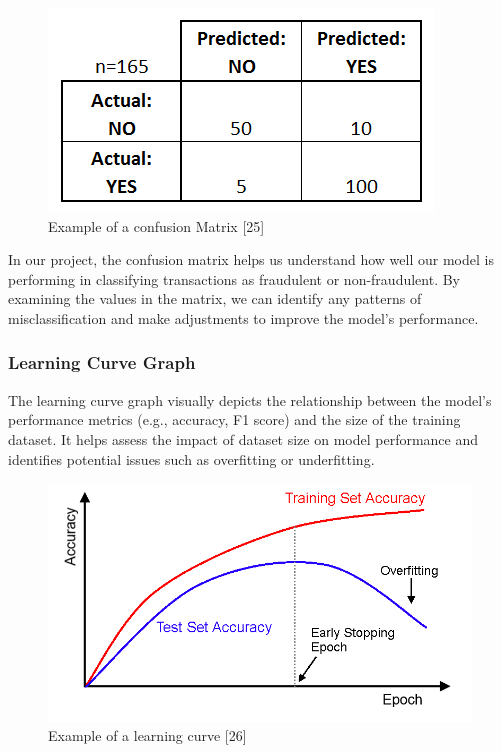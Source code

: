 \documentclass[conference]{IEEEtran}
\begin{document}
\begin{figure}[H]
    \centering
    \includegraphics[width=1\linewidth]{images/confusionMatrixExample.png}
    \caption{Example of a confusion Matrix [25]}
    \label{fig:enter-label}
\end{figure}

In our project, the confusion matrix helps us understand how well our model is performing in classifying transactions as fraudulent or non-fraudulent. By examining the values in the matrix, we can identify any patterns of misclassification and make adjustments to improve the model's performance.

\subsubsection{Learning Curve Graph}

The learning curve graph visually depicts the relationship between the model's performance metrics (e.g., accuracy, F1 score) and the size of the training dataset. It helps assess the impact of dataset size on model performance and identifies potential issues such as overfitting or underfitting.

\begin{figure}[H]
    \centering
    \includegraphics[width=1\linewidth]{images/learningCurveExample.png}
    \caption{Example of a learning curve [26]}
    \label{fig:enter-label}
\end{figure}
\end{document}
